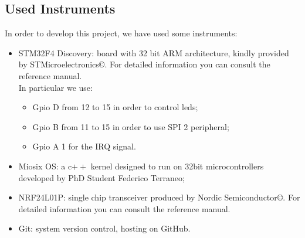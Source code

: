 \documentclass[11pt,a4paper,oneside]{article}
\begin{document}
\subsection{Used Instruments}
In order to develop this project, we have used some instruments:
\begin{itemize}
\item STM32F4 Discovery: board with 32 bit ARM architecture, kindly provided by STMicroelectronics\copyright. For detailed information you can consult the reference manual\cite{manual-stm32f4}.\\In particular we use:
\begin{itemize}
\item Gpio D from 12 to 15 in order to control leds;
\item Gpio B from 11 to 15 in order to use SPI 2 peripheral;
\item Gpio A 1 for the IRQ signal.

\end{itemize}
\item Miosix OS: a c$++$ kernel designed to run on 32bit microcontrollers developed by PhD Student Federico Terraneo\cite{miosix};
\item NRF24L01P: single chip transceiver produced by Nordic Semiconductor\copyright. For detailed information you can consult the reference manual.\cite{manual nrf24l01p}
\item Git: system version control, hosting on GitHub\cite{github}. 
\end{itemize}
\newpage
\end{document}
